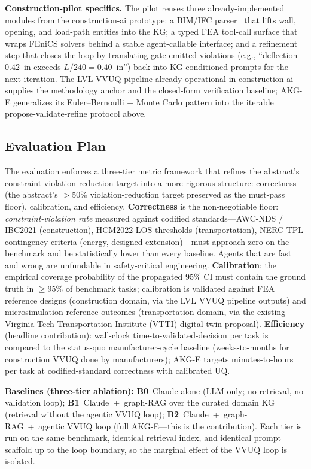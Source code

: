 \documentclass[conference, 10pt]{IEEEtran}
\begin{document}
\textbf{Construction-pilot specifics.} The pilot reuses three already-implemented modules from the construction-ai prototype: a BIM/IFC parser~\cite{Eastman2011BIM} that lifts wall, opening, and load-path entities into the KG; a typed FEA tool-call surface that wraps FEniCS solvers behind a stable agent-callable interface; and a refinement step that closes the loop by translating gate-emitted violations (e.g., ``deflection $0.42$~in exceeds $L/240=0.40$~in'') back into KG-conditioned prompts for the next iteration. The LVL VVUQ pipeline already operational in construction-ai supplies the methodology anchor and the closed-form verification baseline; AKG-E generalizes its Euler--Bernoulli + Monte Carlo pattern into the iterable propose-validate-refine protocol above.

\subsection{Evaluation Plan}

The evaluation enforces a three-tier metric framework that refines the abstract's constraint-violation reduction target into a more rigorous structure: correctness (the abstract's $>$50\% violation-reduction target preserved as the must-pass floor), calibration, and efficiency. \textbf{Correctness} is the non-negotiable floor: \textit{constraint-violation rate} measured against codified standards---AWC-NDS / IBC2021 (construction), HCM2022 LOS thresholds (transportation), NERC-TPL contingency criteria (energy, designed extension)---must approach zero on the benchmark and be statistically lower than every baseline. Agents that are fast and wrong are unfundable in safety-critical engineering. \textbf{Calibration}: the empirical coverage probability of the propagated 95\% CI must contain the ground truth in $\geq$95\% of benchmark tasks; calibration is validated against FEA reference designs (construction domain, via the LVL VVUQ pipeline outputs) and microsimulation reference outcomes (transportation domain, via the existing Virginia Tech Transportation Institute (VTTI) digital-twin proposal). \textbf{Efficiency} (headline contribution): wall-clock time-to-validated-decision per task is compared to the status-quo manufacturer-cycle baseline (weeks-to-months for construction VVUQ done by manufacturers); AKG-E targets minutes-to-hours per task at codified-standard correctness with calibrated UQ.

\textbf{Baselines (three-tier ablation):} \textbf{B0}~Claude alone (LLM-only; no retrieval, no validation loop); \textbf{B1}~Claude~+~graph-RAG over the curated domain KG (retrieval without the agentic VVUQ loop); \textbf{B2}~Claude~+~graph-RAG~+~agentic VVUQ loop (full AKG-E---this is the contribution). Each tier is run on the same benchmark, identical retrieval index, and identical prompt scaffold up to the loop boundary, so the marginal effect of the VVUQ loop is isolated.
\end{document}
